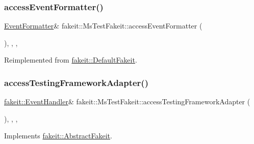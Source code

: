 \subsubsection{\texorpdfstring{accessEventFormatter()}{accessEventFormatter()}\hspace{0.1cm}{\footnotesize\ttfamily [2/2]}}
{\footnotesize\ttfamily \mbox{\hyperlink{structfakeit_1_1EventFormatter}{Event\+Formatter}}\& fakeit\+::\+Ms\+Test\+Fakeit\+::access\+Event\+Formatter (\begin{DoxyParamCaption}{ }\end{DoxyParamCaption})\hspace{0.3cm}{\ttfamily [inline]}, {\ttfamily [override]}, {\ttfamily [protected]}, {\ttfamily [virtual]}}



Reimplemented from \mbox{\hyperlink{classfakeit_1_1DefaultFakeit_a02cb8f08a94e7bf830c87f74f20c9bd9}{fakeit\+::\+Default\+Fakeit}}.

\mbox{\label{classfakeit_1_1MsTestFakeit_a740fea3743adab01ac711a65b2efc2bf}} 
\subsubsection{\texorpdfstring{accessTestingFrameworkAdapter()}{accessTestingFrameworkAdapter()}\hspace{0.1cm}{\footnotesize\ttfamily [1/2]}}
{\footnotesize\ttfamily \mbox{\hyperlink{structfakeit_1_1EventHandler}{fakeit\+::\+Event\+Handler}}\& fakeit\+::\+Ms\+Test\+Fakeit\+::access\+Testing\+Framework\+Adapter (\begin{DoxyParamCaption}{ }\end{DoxyParamCaption})\hspace{0.3cm}{\ttfamily [inline]}, {\ttfamily [override]}, {\ttfamily [protected]}, {\ttfamily [virtual]}}



Implements \mbox{\hyperlink{classfakeit_1_1AbstractFakeit_a9476180a503524d49d1978fbbc125b01}{fakeit\+::\+Abstract\+Fakeit}}.

\mbox{\label{classfakeit_1_1MsTestFakeit_a740fea3743adab01ac711a65b2efc2bf}} 

